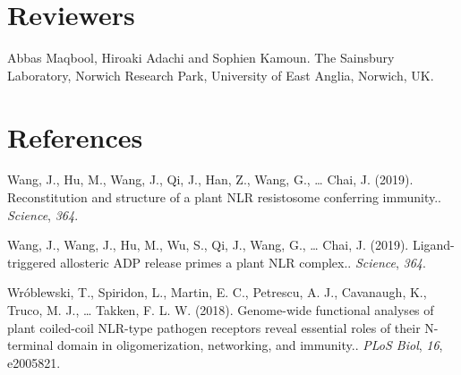 \documentclass[10pt]{article}
\begin{document}
\section*{Reviewers}

{\label{194638}}

Abbas Maqbool, Hiroaki Adachi and Sophien Kamoun. The Sainsbury
Laboratory, Norwich Research Park, University of East Anglia, Norwich,
UK.

\FloatBarrier
\section*{References}\sloppy
{}
\label{csl:2}Wang, J., Hu, M., Wang, J., Qi, J., Han, Z., Wang, G., … Chai, J. (2019). {Reconstitution and structure of a plant NLR resistosome conferring immunity.}. \textit{Science}, \textit{364}.

\label{csl:1}Wang, J., Wang, J., Hu, M., Wu, S., Qi, J., Wang, G., … Chai, J. (2019). {Ligand-triggered allosteric ADP release primes a plant NLR complex.}. \textit{Science}, \textit{364}.

\label{csl:3}Wróblewski, T., Spiridon, L., Martin, E. C., Petrescu, A. J., Cavanaugh, K., Truco, M. J., … Takken, F. L. W. (2018). {Genome-wide functional analyses of plant coiled-coil NLR-type pathogen receptors reveal essential roles of their N-terminal domain in oligomerization, networking, and immunity.}. \textit{PLoS Biol}, \textit{16}, e2005821.
\end{document}
